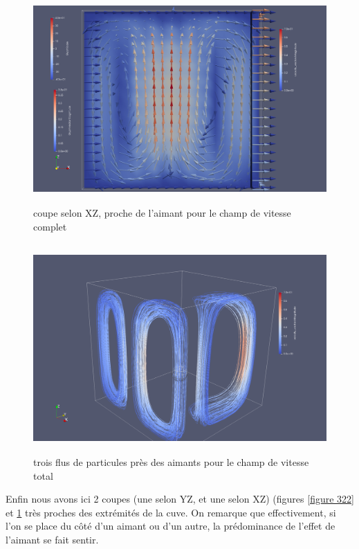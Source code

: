 \documentclass[a4paper,12pt,titlepage]{report}
\begin{document}
\begin{onehalfspace}
\begin{figure}[!h]
\center 
\includegraphics[height = 8cm, keepaspectratio]{graphes/Paraview/total_coupe_pret_aimant_centre.png} 
\caption{coupe selon XZ, proche de l'aimant pour le champ de vitesse complet}
\label{figure 3a}
\end{figure}

\begin{figure}[!h]
\center 
\includegraphics[height = 8cm, keepaspectratio]{graphes/Paraview/total_3_flux.png} 
\caption{\label{figure 3 }trois flus de particules près des aimants pour le champ de vitesse total}
\end{figure}

Enfin nous avons ici 2 coupes (une selon YZ, et une selon XZ) (figures \ref{figure 322} et \ref{figure 3a} très 
proches des extrémités de la cuve. On remarque que effectivement, si l'on se place du côté d'un aimant ou d'un autre, la prédominance de l'effet de l'aimant se fait sentir.


\newpage


\end{onehalfspace}
\end{document}
